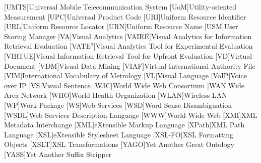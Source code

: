 [UMTS]{Universal Mobile Telecommunication System}
[UoM]{Utility-oriented Measurement}
[UPC]{Universal Product Code}
[URI]{Uniform Resource Identifier}
[URL]{Uniform Resource Locator}
[URN]{Uniform Resource Name}
[USM]{User Storing Manager}
[VA]{Visual Analytics}
[VAIR\"{E}]{Visual Analytics for Information Retrieval Evaluation}
[VATE$^2$]{Visual Analytics Tool for Experimental Evaluation}
[VIRTUE]{Visual Information Retrieval Tool for Upfront Evaluation}
[VD]{Virtual Document}
[VDM]{Visual Data Mining}
[VIAF]{Virtual International Authority File}
[VIM]{International Vocabulary of Metrology}
[VL]{Visual Language}
[VoIP]{Voice over IP}
[VS]{Visual Sentence}
[W3C]{World Wide Web Consortium}
[WAN]{Wide Area Network}
[WHO]{World Health Organization}
[WLAN]{Wireless \acs{LAN}}
[WP]{Work Package}
[WS]{Web Services}
[WSD]{Word Sense Disambiguation}
[WSDL]{Web Services Description Language}
[WWW]{World Wide Web}
[XMI]{\acs{XML} Metadata Interchange}
[XML]{eXtensible Markup Language}
[XPath]{XML Path Language}
[XSL]{eXtensible Stylesheet Language}
[XSL-FO]{\acs{XSL} Formatting Objects}
[XSLT]{\acs{XSL} Transformations}
[YAGO]{Yet Another Great Ontology}
[YASS]{Yet Another Suffix Stripper}
